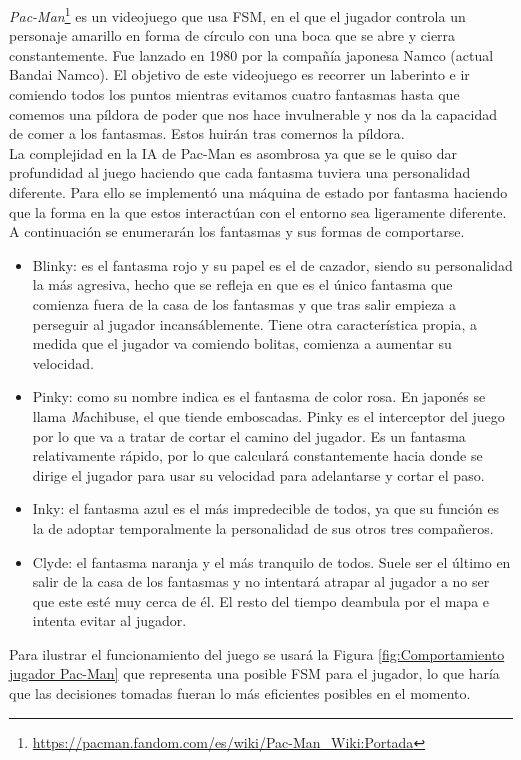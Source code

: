 \textit{Pac-Man}\footnote{\url{https://pacman.fandom.com/es/wiki/Pac-Man_Wiki:Portada}} es un videojuego que usa FSM, en el que el jugador controla un personaje amarillo en forma de círculo con una boca que se abre y cierra constantemente. Fue lanzado en 1980 por la compañía japonesa Namco (actual Bandai Namco). El objetivo de este videojuego es recorrer un laberinto e ir comiendo todos los puntos mientras evitamos cuatro fantasmas hasta que comemos una píldora de poder que nos hace invulnerable y nos da la capacidad de comer a los fantasmas. Estos huirán tras comernos la píldora.\\
La complejidad en la IA de Pac-Man es asombrosa ya que se le quiso dar profundidad al juego haciendo que cada fantasma tuviera una personalidad diferente. Para ello se implementó una máquina de estado por fantasma haciendo que la forma en la que estos interactúan con el entorno sea ligeramente diferente.
A continuación se enumerarán los fantasmas y sus formas de comportarse.
\begin{itemize}
	 \item Blinky: es el fantasma rojo y su papel es el de cazador, siendo su personalidad la más agresiva, hecho que se refleja en que es el único fantasma que comienza fuera de la casa de los fantasmas y que tras salir empieza a perseguir al jugador incansáblemente. Tiene otra característica propia, a medida que el jugador va comiendo bolitas, comienza a aumentar su velocidad.
	 \item Pinky: como su nombre indica es el fantasma de color rosa. En japonés se llama \textit Machibuse, el que tiende emboscadas. Pinky es el interceptor del juego por lo que va a tratar de cortar el camino del jugador. Es un fantasma relativamente rápido, por lo que calculará constantemente hacia donde se dirige el jugador para usar su velocidad para adelantarse y cortar el paso.
	 \item Inky: el fantasma azul es el más impredecible de todos, ya que su función es la de adoptar temporalmente la personalidad de sus otros tres compañeros.
	 \item Clyde: el fantasma naranja y el más tranquilo de todos. Suele ser el último en salir de la casa de los fantasmas y no intentará atrapar al jugador a no ser que este esté muy cerca de él. El resto del tiempo deambula por el mapa e intenta evitar al jugador.
\end{itemize}
Para ilustrar el funcionamiento del juego se usará la Figura \ref{fig:Comportamiento jugador Pac-Man} que representa una posible FSM para el jugador, lo que haría que las decisiones tomadas fueran lo más eficientes posibles en el momento.\\

